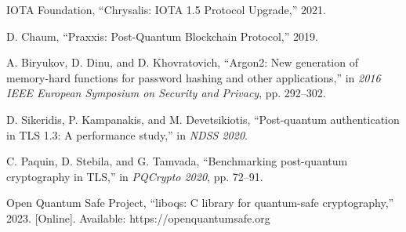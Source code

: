 \documentclass[12pt,a4paper]{article}
\begin{document}
\begin{thebibliography}{99}
IOTA Foundation, ``Chrysalis: IOTA 1.5 Protocol Upgrade,'' 2021.

D. Chaum, ``Praxxis: Post-Quantum Blockchain Protocol,'' 2019.

A. Biryukov, D. Dinu, and D. Khovratovich, ``Argon2: New generation of memory-hard functions for password hashing and other applications,'' in \textit{2016 IEEE European Symposium on Security and Privacy}, pp. 292--302.

D. Sikeridis, P. Kampanakis, and M. Devetsikiotis, ``Post-quantum authentication in TLS 1.3: A performance study,'' in \textit{NDSS 2020}.

C. Paquin, D. Stebila, and G. Tamvada, ``Benchmarking post-quantum cryptography in TLS,'' in \textit{PQCrypto 2020}, pp. 72--91.

Open Quantum Safe Project, ``liboqs: C library for quantum-safe cryptography,'' 2023. [Online]. Available: https://openquantumsafe.org

\end{thebibliography}
\end{document}
